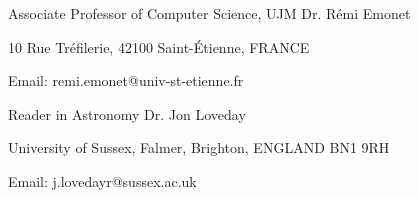 \begin{multicols}{2}
\begin{cventries}
	\cventry
	{Associate Professor of Computer Science, UJM}
	{Dr. R\'{e}mi Emonet}
	{}
	{}
	{
		\begin{cvitems}
			\item {10 Rue Tréfilerie, 42100 Saint-Étienne, FRANCE}
			\item{Email: remi.emonet@univ-st-etienne.fr}
		\end{cvitems}
	}
	\newline
	\newline
	\cventry
	{Reader in Astronomy}
	{Dr. Jon Loveday}
	{}
	{}
	{
		\begin{cvitems}
			\item {University of Sussex, Falmer, Brighton, ENGLAND BN1 9RH}
			\item{Email: j.lovedayr@sussex.ac.uk}
		\end{cvitems}
	}

\end{cventries}

\end{multicols}
